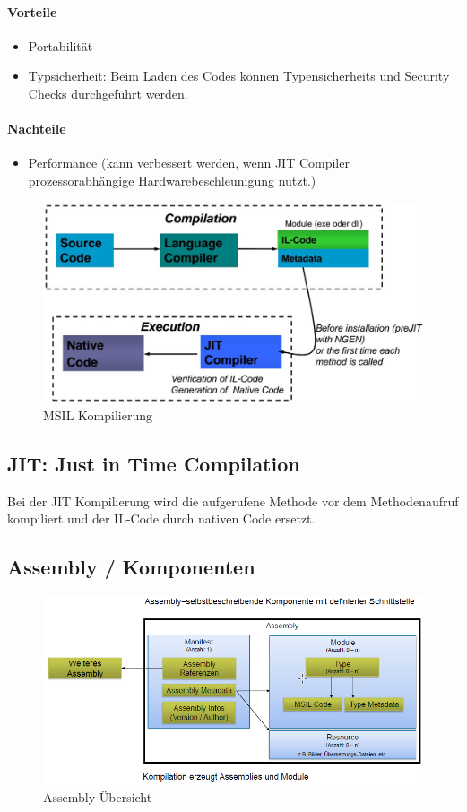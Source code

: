 \documentclass[
a4paper,
oneside,
10pt,
fleqn,
headsepline,
toc=listofnumbered, 
bibliography=totocnumbered]{scrartcl}
\begin{document}
\paragraph{Vorteile}
\begin{itemize}
	\item Portabilität
	\item Typsicherheit: Beim Laden des Codes können Typensicherheits und Security Checks durchgeführt werden.
\end{itemize}
\paragraph{Nachteile}
\begin{itemize}
	\item Performance (kann verbessert werden, wenn JIT Compiler prozessorabhängige Hardwarebeschleunigung nutzt.)
\end{itemize}

\begin{figure}[h]
\centering
\includegraphics[width=0.5\linewidth]{images/msil_compilation}
\caption{MSIL Kompilierung}
\label{fig:msilcompilation}
\end{figure}

\subsection{JIT: Just in Time Compilation}
Bei der JIT Kompilierung wird die aufgerufene Methode vor dem Methodenaufruf kompiliert und der IL-Code durch nativen Code ersetzt.

\subsection{Assembly / Komponenten}
\begin{figure}[h!]
\centering
\includegraphics[width=0.7\linewidth]{images/assembly}
\caption{Assembly Übersicht}
\label{fig:assembly}
\end{figure}
\end{document}
